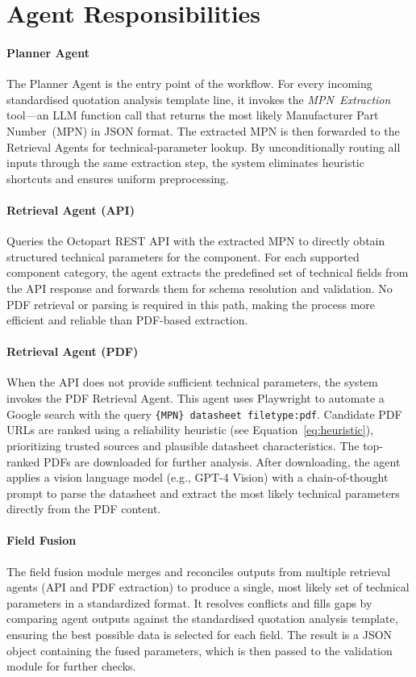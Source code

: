 \section{Agent Responsibilities}

\paragraph{Planner Agent}  
The Planner Agent is the entry point of the workflow. For every incoming standardised quotation analysis template line, it invokes the \emph{MPN~Extraction} tool—an LLM function call that returns the most likely Manufacturer Part Number~(MPN) in JSON format. The extracted MPN is then forwarded to the Retrieval Agents for technical‐parameter lookup. By unconditionally routing all inputs through the same extraction step, the system eliminates heuristic shortcuts and ensures uniform preprocessing.


\paragraph{Retrieval Agent (API)}  
Queries the Octopart REST API with the extracted MPN to directly obtain structured technical parameters for the component.  
For each supported component category, the agent extracts the predefined set of technical fields from the API response and forwards them for schema resolution and validation.  
No PDF retrieval or parsing is required in this path, making the process more efficient and reliable than PDF-based extraction.

\paragraph{Retrieval Agent (PDF)}  
When the API does not provide sufficient technical parameters, the system invokes the PDF Retrieval Agent. This agent uses Playwright to automate a Google search with the query  
\texttt{\{MPN\} datasheet filetype:pdf}.  
Candidate PDF URLs are ranked using a reliability heuristic (see Equation~\ref{eq:heuristic}), prioritizing trusted sources and plausible datasheet characteristics. The top-ranked PDFs are downloaded for further analysis.  
After downloading, the agent applies a vision language model (e.g., GPT-4 Vision) with a chain-of-thought prompt to parse the datasheet and extract the most likely technical parameters directly from the PDF content.

\paragraph{Field Fusion}
The field fusion module merges and reconciles outputs from multiple retrieval agents (API and PDF extraction) to produce a single, most likely set of technical parameters in a standardized format. It resolves conflicts and fills gaps by comparing agent outputs against the standardised quotation analysis template, ensuring the best possible data is selected for each field. The result is a JSON object containing the fused parameters, which is then passed to the validation module for further checks.

